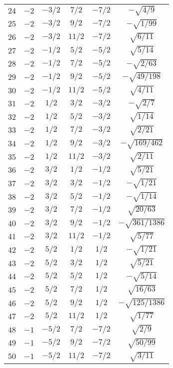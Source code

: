 \begin{table}
\begin{center}
\begin{tabular}{|c|c|c|c|c|c|}
$24$ & $-2$ & $-3/2$ & $7/2$ & $-7/2$ & $-\sqrt{4/9}$ \\ 
$25$ & $-2$ & $-3/2$ & $9/2$ & $-7/2$ & $-\sqrt{1/99}$ \\ 
$26$ & $-2$ & $-3/2$ & $11/2$ & $-7/2$ & $\sqrt{6/11}$ \\ 
$27$ & $-2$ & $-1/2$ & $5/2$ & $-5/2$ & $\sqrt{5/14}$ \\ 
$28$ & $-2$ & $-1/2$ & $7/2$ & $-5/2$ & $-\sqrt{2/63}$ \\ 
$29$ & $-2$ & $-1/2$ & $9/2$ & $-5/2$ & $-\sqrt{49/198}$ \\ 
$30$ & $-2$ & $-1/2$ & $11/2$ & $-5/2$ & $\sqrt{4/11}$ \\ 
$31$ & $-2$ & $1/2$ & $3/2$ & $-3/2$ & $-\sqrt{2/7}$ \\ 
$32$ & $-2$ & $1/2$ & $5/2$ & $-3/2$ & $\sqrt{1/14}$ \\ 
$33$ & $-2$ & $1/2$ & $7/2$ & $-3/2$ & $\sqrt{2/21}$ \\ 
$34$ & $-2$ & $1/2$ & $9/2$ & $-3/2$ & $-\sqrt{169/462}$ \\ 
$35$ & $-2$ & $1/2$ & $11/2$ & $-3/2$ & $\sqrt{2/11}$ \\ 
$36$ & $-2$ & $3/2$ & $1/2$ & $-1/2$ & $\sqrt{5/21}$ \\ 
$37$ & $-2$ & $3/2$ & $3/2$ & $-1/2$ & $-\sqrt{1/21}$ \\ 
$38$ & $-2$ & $3/2$ & $5/2$ & $-1/2$ & $-\sqrt{1/14}$ \\ 
$39$ & $-2$ & $3/2$ & $7/2$ & $-1/2$ & $\sqrt{20/63}$ \\ 
$40$ & $-2$ & $3/2$ & $9/2$ & $-1/2$ & $-\sqrt{361/1386}$ \\ 
$41$ & $-2$ & $3/2$ & $11/2$ & $-1/2$ & $\sqrt{5/77}$ \\ 
$42$ & $-2$ & $5/2$ & $1/2$ & $1/2$ & $-\sqrt{1/21}$ \\ 
$43$ & $-2$ & $5/2$ & $3/2$ & $1/2$ & $\sqrt{5/21}$ \\ 
$44$ & $-2$ & $5/2$ & $5/2$ & $1/2$ & $-\sqrt{5/14}$ \\ 
$45$ & $-2$ & $5/2$ & $7/2$ & $1/2$ & $\sqrt{16/63}$ \\ 
$46$ & $-2$ & $5/2$ & $9/2$ & $1/2$ & $-\sqrt{125/1386}$ \\ 
$47$ & $-2$ & $5/2$ & $11/2$ & $1/2$ & $\sqrt{1/77}$ \\ 
$48$ & $-1$ & $-5/2$ & $7/2$ & $-7/2$ & $\sqrt{2/9}$ \\ 
$49$ & $-1$ & $-5/2$ & $9/2$ & $-7/2$ & $\sqrt{50/99}$ \\ 
$50$ & $-1$ & $-5/2$ & $11/2$ & $-7/2$ & $\sqrt{3/11}$ \\ 

\end{tabular}
\end{center}
\end{table}

